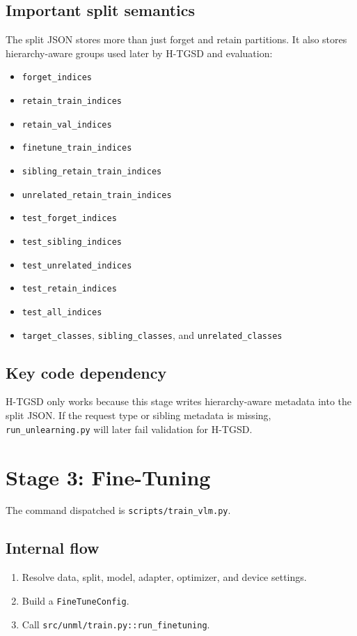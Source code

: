 \documentclass[10pt,a4paper]{article}
\begin{document}
\subsection{Important split semantics}
The split JSON stores more than just forget and retain partitions. It also stores hierarchy-aware groups used later by H-TGSD and evaluation:
\begin{itemize}
  \item \texttt{forget\_indices}
  \item \texttt{retain\_train\_indices}
  \item \texttt{retain\_val\_indices}
  \item \texttt{finetune\_train\_indices}
  \item \texttt{sibling\_retain\_train\_indices}
  \item \texttt{unrelated\_retain\_train\_indices}
  \item \texttt{test\_forget\_indices}
  \item \texttt{test\_sibling\_indices}
  \item \texttt{test\_unrelated\_indices}
  \item \texttt{test\_retain\_indices}
  \item \texttt{test\_all\_indices}
  \item \texttt{target\_classes}, \texttt{sibling\_classes}, and \texttt{unrelated\_classes}
\end{itemize}

\subsection{Key code dependency}
H-TGSD only works because this stage writes hierarchy-aware metadata into the split JSON. If the request type or sibling metadata is missing, \texttt{run\_unlearning.py} will later fail validation for H-TGSD.

\section{Stage 3: Fine-Tuning}
The command dispatched is \texttt{scripts/train\_vlm.py}.

\subsection{Internal flow}
\begin{enumerate}
  \item Resolve data, split, model, adapter, optimizer, and device settings.
  \item Build a \texttt{FineTuneConfig}.
  \item Call \texttt{src/unml/train.py::run\_finetuning}.
\end{enumerate}
\end{document}
